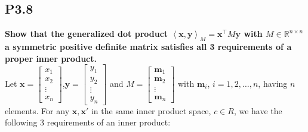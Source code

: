 \documentclass[12pt]{article}
\begin{document}
\subsection*{P3.8}
\textbf{Show that the generalized dot product $\left \langle \mathbf x,\mathbf y \right \rangle_M = \mathbf x^\top M \mathbf y$ with $M\in\mathbb{R}^{n\times n}$ a symmetric positive definite matrix satisfies all 3 requirements of a proper inner product.}\\
Let $\mathbf x = \begin{bmatrix}
x_1\\
x_2\\
\vdots\\
x_n
\end{bmatrix}$,$\mathbf y = \begin{bmatrix}
y_1\\
y_2\\
\vdots \\
y_n
\end{bmatrix}$ and $M = \begin{bmatrix}
\mathbf m_1\\
\mathbf m_2\\
\vdots\\
\mathbf m_n

\end{bmatrix}$ with $\mathbf m_i$, $i=1,2,\ldots,n$, having $n$ elements. For any $\mathbf x,\mathbf x'$ in the same inner product space, $c \in R$, we have the following 3 requirements of an inner product:
\end{document}

